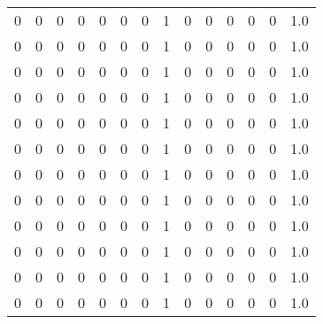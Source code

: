 \begin{tabular}{rrrrrrrrrrrrrr}
       0 &       0 &          0 &               0 &                0 &       0 &          0 &          1 &         0 &         0 &      0 &             0 &         0 &      1.0 \\
       0 &       0 &          0 &               0 &                0 &       0 &          0 &          1 &         0 &         0 &      0 &             0 &         0 &      1.0 \\
       0 &       0 &          0 &               0 &                0 &       0 &          0 &          1 &         0 &         0 &      0 &             0 &         0 &      1.0 \\
       0 &       0 &          0 &               0 &                0 &       0 &          0 &          1 &         0 &         0 &      0 &             0 &         0 &      1.0 \\
       0 &       0 &          0 &               0 &                0 &       0 &          0 &          1 &         0 &         0 &      0 &             0 &         0 &      1.0 \\
       0 &       0 &          0 &               0 &                0 &       0 &          0 &          1 &         0 &         0 &      0 &             0 &         0 &      1.0 \\
       0 &       0 &          0 &               0 &                0 &       0 &          0 &          1 &         0 &         0 &      0 &             0 &         0 &      1.0 \\
       0 &       0 &          0 &               0 &                0 &       0 &          0 &          1 &         0 &         0 &      0 &             0 &         0 &      1.0 \\
       0 &       0 &          0 &               0 &                0 &       0 &          0 &          1 &         0 &         0 &      0 &             0 &         0 &      1.0 \\
       0 &       0 &          0 &               0 &                0 &       0 &          0 &          1 &         0 &         0 &      0 &             0 &         0 &      1.0 \\
       0 &       0 &          0 &               0 &                0 &       0 &          0 &          1 &         0 &         0 &      0 &             0 &         0 &      1.0 \\
       0 &       0 &          0 &               0 &                0 &       0 &          0 &          1 &         0 &         0 &      0 &             0 &         0 &      1.0 \\

\end{tabular}
